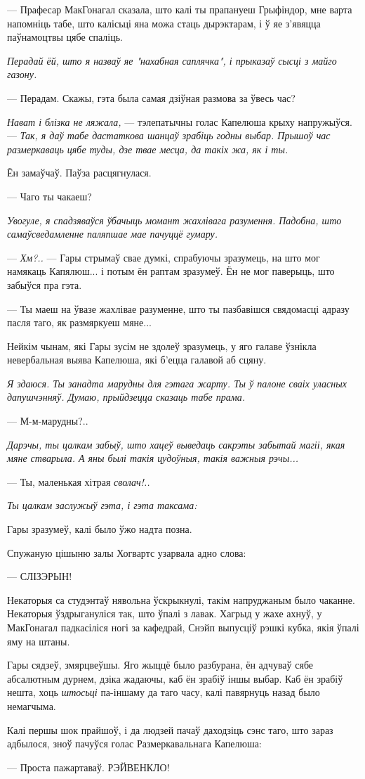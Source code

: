 --- Прафесар МакГонагал сказала, што калі ты прапануеш Грыфіндор,
мне варта напомніць табе, што калісьці яна можа стаць дырэктарам, і ў яе 
з'явяцца паўнамоцтвы цябе спаліць.

\emph{Перадай ёй, што я назваў яе "нахабная саплячка", і прыказаў сысці 
з майго газону.}

--- Перадам. Скажы, гэта была самая дзіўная размова за ўвесь час?

\emph{Нават і блізка не ляжала,}  --- тэлепатычны голас Капелюша 
крыху напружыўся. --- \emph{Так, я даў табе дастаткова шанцаў зрабіць годны выбар. 
Прышоў час размеркаваць цябе туды, дзе твае месца, да такіх жа, як і ты.}

Ён замаўчаў. Паўза расцягнулася.

--- Чаго ты чакаеш?

\emph{Увогуле, я спадзяваўся ўбачыць момант жахлівага разумення.
Падобна, што самаўсведамленне паляпшае мае пачуццё гумару.}

--- \emph{Хм?..} --- Гары стрымаў свае думкі, спрабуючы зразумець, на што мог 
намякаць Капялюш... і потым ён раптам зразумеў. Ён не мог паверыць, што забыўся
пра гэта.

--- Ты маеш на ўвазе жахлівае разуменне, што ты пазбавішся свядомасці адразу 
пасля таго, як размяркуеш мяне...

Нейкім чынам, які Гары зусім не здолеў зразумець, у яго галаве ўзнікла невербальная
выява Капелюша, які б'ецца галавой аб сцяну.

\emph{Я здаюся. Ты занадта марудны для гэтага жарту. 
Ты ў палоне сваіх уласных дапушчэнняў. Думаю, прыйдзецца сказаць табе прама.}

--- М-м-марудны?..

\emph{Дарэчы, ты цалкам забыў, што хацеў выведаць сакрэты забытай магіі, якая мяне стварыла.
А яны былі такія цудоўныя, такія важныя рэчы...}

--- Ты, маленькая хітрая \emph{сволач!..}

\emph{Ты цалкам заслужыў гэта, і гэта таксама:}

Гары зразумеў, калі было ўжо надта позна.

Спужаную цішыню залы Хогвартс узарвала адно слова:

--- СЛІЗЭРЫН!

Некаторыя са студэнтаў нявольна ўскрыкнулі, такім напруджаным было чаканне.
Некаторыя ўздрыгануліся так, што ўпалі з лавак. Хагрыд у жахе ахнуў,
у МакГонагал падкасіліся ногі за кафедрай, Снэйп выпусціў рэшкі кубка, якія ўпалі
яму на штаны.

Гары сядзеў, змярцвеўшы. Яго жыццё было разбурана, ён адчуваў сябе абсалютным дурнем, 
дзіка жадаючы, каб ён зрабіў іншы выбар. Каб ён зрабіў нешта, хоць \emph{штосьці}
па-іншаму да таго часу, калі павярнуць назад было немагчыма.

Калі першы шок прайшоў, і да людзей пачаў даходзіць сэнс таго, што зараз адбылося,
зноў пачуўся голас Размеркавальнага Капелюша:

--- Проста пажартаваў. РЭЙВЕНКЛО!
